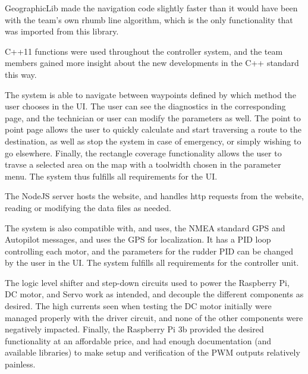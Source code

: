GeographicLib made the navigation code slightly faster than it would have been with the team's own rhumb line algorithm, which is the only functionality that was imported from this library. 

C++11 functions were used throughout the controller system, and the team members gained more insight about the new developments in the C++ standard this way.

The system is able to navigate between waypoints defined by which method the user chooses in the UI. The user can see the diagnostics in the corresponding page, and the technician or user can modify the parameters as well. The point to point page allows the user to quickly calculate and start traversing a route to the destination, as well as stop the system in case of emergency, or simply wishing to go elsewhere. Finally, the rectangle coverage functionality allows the user to travse a selected area on the map with a toolwidth chosen in the parameter menu. The system thus fulfills all requirements for the UI. 

The NodeJS server hosts the website, and handles http requests from the website, reading or modifying the data files as needed. %

The system is also compatible with, and uses, the NMEA standard GPS and Autopilot messages, and uses the GPS for localization. It has a PID loop controlling each motor, and the parameters for the rudder PID can be changed by the user in the UI. The system fulfills all requirements for the controller unit. 

The logic level shifter and step-down circuits used to power the Raspberry Pi, DC motor, and Servo work as intended, and decouple the different components as desired. The high currents seen when testing the DC motor initially were managed properly with the driver circuit, and none of the other components were negatively impacted. Finally, the Raspberry Pi 3b provided the desired functionality at an affordable price, and had enough documentation (and available libraries) to make setup and verification of the PWM outputs relatively painless. 